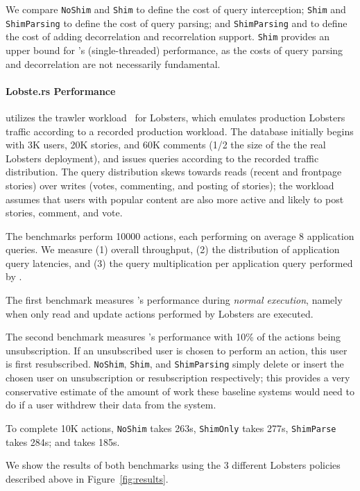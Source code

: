 We compare \texttt{NoShim} and \texttt{Shim} to define the cost of query interception; \texttt{Shim}
and \texttt{ShimParsing} to define the cost of query parsing; and \texttt{ShimParsing} and
\texttt{\sys{}} to define the cost of adding decorrelation and recorrelation support.  \texttt{Shim}
provides an upper bound for \sys{}'s (single-threaded) performance, as the costs of query parsing
and decorrelation are not necessarily fundamental.

\paragraph{Lobste.rs Performance}
\sys{} utilizes the trawler workload~\cite{trawler} for Lobsters, which emulates production
Lobsters traffic according to a recorded production workload. The database initially begins with 3K
users, 20K stories, and 60K comments (1/2 the size of the the real Lobsters deployment), and issues
queries according to the recorded traffic distribution. The query distribution skews towards reads
(recent and frontpage stories) over writes (votes, commenting, and posting of stories); the
workload assumes that users with popular content are also more active and likely to post stories,
comment, and vote.

The benchmarks perform 10000 actions, each performing on average 8 application queries. 
We measure (1) overall throughput, (2) the distribution of application query
latencies, and (3) the query multiplication per application query performed by \sys{}.

The first benchmark measures \sys{}'s performance during \emph{normal execution}, namely when only
read and update actions performed by Lobsters are executed. 

The second benchmark measures \sys{}'s performance with 10\% of the actions being unsubscription. If
an unsubscribed user is chosen to perform an action, this user is first resubscribed.
\texttt{NoShim}, \texttt{Shim}, and \texttt{ShimParsing} simply delete or insert the chosen user on
unsubscription or resubscription respectively; this provides a very conservative estimate of the
amount of work these baseline systems would need to do if a user withdrew their data from the system.

To complete 10K actions, \texttt{NoShim} takes 263s, \texttt{ShimOnly} takes 277s, \texttt{ShimParse}
takes 284s; and \texttt{\sys{}} takes 185s.

We show the results of both benchmarks using the 3 different Lobsters policies described above in
Figure~\ref{fig:results}. 
